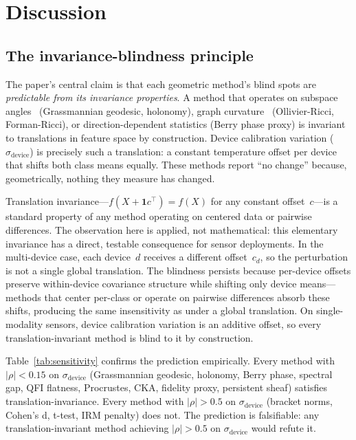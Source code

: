 \documentclass[11pt]{article}
\begin{document}
\section{Discussion}
\label{sec:discussion}

\subsection{The invariance-blindness principle}

The paper's central claim is that each geometric method's blind spots
are \emph{predictable from its invariance properties}.  A method that operates on subspace
angles~\citep{absil2008optimization,chikuse2003statistics} (Grassmannian geodesic, holonomy),
graph curvature~\citep{samal2018comparative} (Ollivier-Ricci,
Forman-Ricci), or direction-dependent statistics (Berry phase proxy) is
invariant to translations in feature space by construction.  Device calibration variation ($\sigma_\text{device}$)
is precisely such a translation: a constant temperature offset per
device that shifts both class means equally.  These methods report
``no change'' because, geometrically, nothing they measure has changed.

Translation invariance---$f(X + \mathbf{1}c^\top) = f(X)$ for any
constant offset~$c$---is a standard property of any method operating on
centered data or pairwise differences.  The observation here is applied,
not mathematical: this elementary invariance has a direct, testable
consequence for sensor deployments.  In the multi-device case, each
device~$d$ receives a different offset~$c_d$, so the perturbation is
not a single global translation.  The blindness persists because per-device
offsets preserve within-device covariance structure while shifting only
device means---methods that center per-class or operate on pairwise
differences absorb these shifts, producing the same insensitivity as
under a global translation.  On single-modality sensors, device
calibration variation is an additive offset, so every
translation-invariant method is blind to it by construction.

Table~\ref{tab:sensitivity} confirms the prediction empirically.  Every
method with $|\rho| < 0.15$ on $\sigma_\text{device}$ (Grassmannian
geodesic, holonomy, Berry phase, spectral gap, QFI flatness, Procrustes,
CKA, fidelity proxy, persistent sheaf) satisfies
translation-invariance.  Every method with $|\rho| > 0.5$ on
$\sigma_\text{device}$ (bracket norms, Cohen's d, t-test, IRM
penalty) does not.  The prediction is falsifiable: any
translation-invariant method achieving $|\rho| > 0.5$ on
$\sigma_\text{device}$ would refute it.
\end{document}
